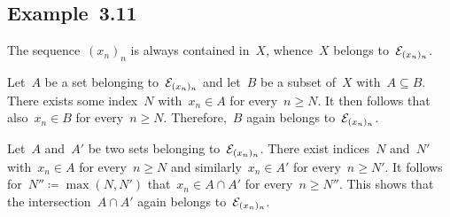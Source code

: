 \subsection{Example~3.11}

The sequence~$(x_n)_n$ is always contained in~$X$, whence~$X$ belongs to~$\mathcal{E}_{(x_n)_n}$.

Let~$A$ be a set belonging to~$\mathcal{E}_{(x_n)_n}$ and let~$B$ be a subset of~$X$ with~$A ⊆ B$.
There exists some index~$N$ with~$x_n ∈ A$ for every~$n ≥ N$.
It then follows that also~$x_n ∈ B$ for every~$n ≥ N$.
Therefore,~$B$ again belongs to~$\mathcal{E}_{(x_n)_n}$.

Let~$A$ and~$A'$ be two sets belonging to~$\mathcal{E}_{(x_n)_n}$.
There exist indices~$N$ and~$N'$ with~$x_n ∈ A$ for every~$n ≥ N$ and similarly~$x_n ∈ A'$ for every~$n ≥ N'$.
It follows for~$N'' ≔ \max(N, N')$ that~$x_n ∈ A ∩ A'$ for every~$n ≥ N''$.
This shows that the intersection~$A ∩ A'$ again belongs to~$\mathcal{E}_{(x_n)_n}$.
